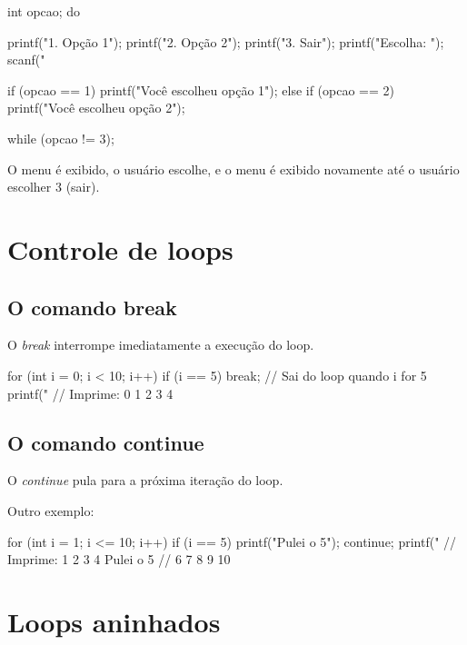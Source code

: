 \begin{ccode}
  int opcao;
  do {
    printf("1. Opção 1\n");
    printf("2. Opção 2\n");
    printf("3. Sair\n");
    printf("Escolha: ");
    scanf("%

    if (opcao == 1) {
      printf("Você escolheu opção 1\n");
    } else if (opcao == 2) {
      printf("Você escolheu opção 2\n");
    }
  } while (opcao != 3);
\end{ccode}

O menu é exibido, o usuário escolhe, e o menu é exibido novamente até o usuário escolher 3 (sair).

\section{Controle de loops}

\subsection{O comando break}

O \textit{break} interrompe imediatamente a execução do loop.

\begin{ccode}
  for (int i = 0; i < 10; i++) {
    if (i == 5) {
      break;  // Sai do loop quando i for 5
    }
    printf("%
  }
  // Imprime: 0 1 2 3 4
\end{ccode}

\subsection{O comando continue}

O \textit{continue} pula para a próxima iteração do loop.


Outro exemplo:

\begin{ccode}
  for (int i = 1; i <= 10; i++) {
    if (i == 5) {
      printf("Pulei o 5\n");
      continue;
    }
    printf("%
  }
  // Imprime: 1 2 3 4 Pulei o 5
  //          6 7 8 9 10
\end{ccode}

\section{Loops aninhados}

